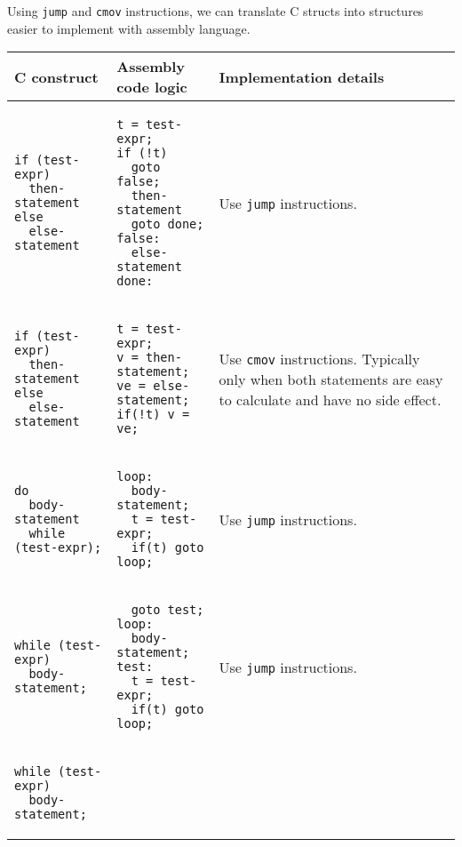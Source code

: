 Using \texttt{jump} and \texttt{cmov} instructions, we can translate C structs into structures easier to implement with assembly language.
\begin{center}
\tablefirsthead{}
\tablelasttail{}
\begin{supertabular}{m{120pt}m{120pt}m{120pt}}\toprule
C construct & Assembly code logic & Implementation details\\\midrule
\begin{verbatim}
if (test-expr)
  then-statement
else
  else-statement
\end{verbatim} &
\begin{verbatim}
t = test-expr;
if (!t)
  goto false;
  then-statement
  goto done;
false:
  else-statement
done:
\end{verbatim} & Use \texttt{jump} instructions.\\\midrule
\begin{verbatim}
if (test-expr)
  then-statement
else
  else-statement
\end{verbatim} &
\begin{verbatim}
t = test-expr;
v = then-statement;
ve = else-statement;
if(!t) v = ve;
\end{verbatim} & Use \texttt{cmov} instructions. Typically only when both statements are easy to
calculate and have no side effect.\\\midrule\shrinkheight{10cm}
\begin{verbatim}
do
  body-statement
  while (test-expr);
\end{verbatim} &
\begin{verbatim}
loop:
  body-statement;
  t = test-expr;
  if(t) goto loop;
\end{verbatim} & Use \texttt{jump} instructions.\\\midrule
\begin{verbatim}
while (test-expr)
  body-statement;
\end{verbatim} &
\begin{verbatim}
  goto test;
loop:
  body-statement;
test:
  t = test-expr;
  if(t) goto loop;
\end{verbatim} & Use \texttt{jump} instructions.\\\midrule
\begin{verbatim}
while (test-expr)
  body-statement;
\end{verbatim} &

\end{supertabular}
\end{center}
